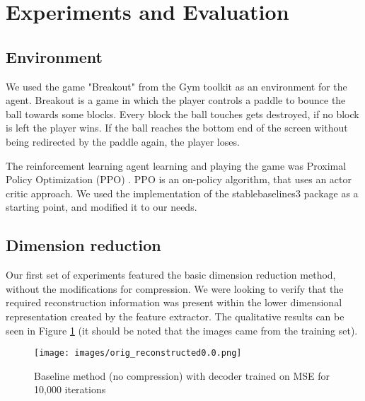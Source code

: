 \section{Experiments and Evaluation}
\subsection{Environment}
We used the game "Breakout" from the Gym toolkit \cite{brockman2016openai} as an
environment for the agent. Breakout is a game in which the player controls a
paddle to bounce the ball towards some blocks. Every block the ball touches gets
destroyed, if no block is left the player wins. If the ball reaches the bottom
end of the screen without being redirected by the paddle again, the player
loses.

The reinforcement learning agent learning and playing the game was Proximal
Policy Optimization (PPO) \cite{raffin2019stable}. PPO is an on-policy
algorithm, that uses an actor critic approach. We used the implementation of the
stablebaselines3 package \cite{raffin2019stable} as a starting point, and
modified it to our needs.

\subsection{Dimension reduction}
Our first set of experiments featured the basic dimension reduction method,
without the modifications for compression. We were looking to verify that the
required reconstruction information was present within the lower dimensional
representation created by the feature extractor. The qualitative results can be
seen in Figure \ref{fig:baseline_MSE} (it should be noted that the images came
from the training set). \\

\begin{figure}[H]
    \centering
    \texttt{[image: images/orig\_reconstructed0.0.png]}
    \caption{Baseline method (no compression) with decoder trained on MSE for 10,000 iterations}
    \label{fig:baseline_MSE}
\end{figure}


